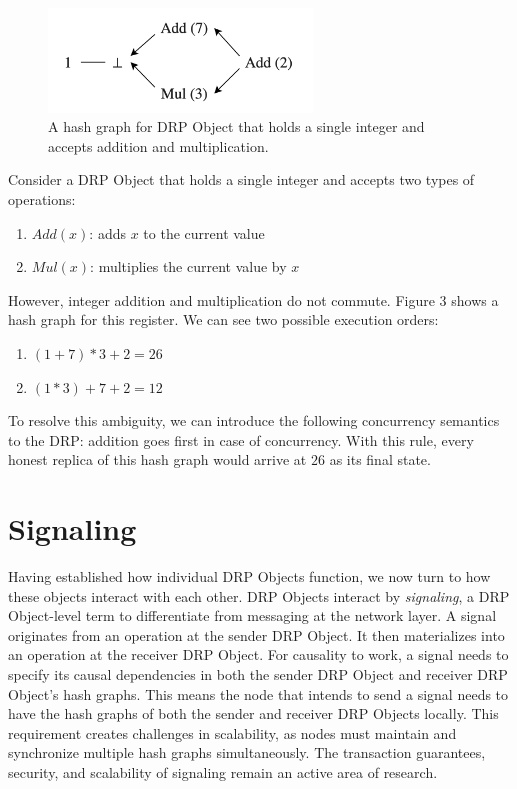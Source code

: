 \documentclass{article}
\begin{document}
\begin{figure}[htp]
    \centering
    \includegraphics[width=7cm]{fig3}
    \caption{A hash graph for DRP Object that holds a single integer and accepts addition and multiplication.}
    \label{fig:3}
\end{figure}

Consider a DRP Object that holds a single integer and accepts two types of operations:
\begin{enumerate}
    \item $Add(x)$: adds $x$ to the current value
    \item $Mul(x)$: multiplies the current value by $x$
\end{enumerate}

However, integer addition and multiplication do not commute. Figure 3 shows a hash graph for this register. We can see two possible execution orders:
\begin{enumerate}
    \item $(1+7)*3+2 = 26$
    \item $(1*3)+7+2 = 12$
\end{enumerate}

To resolve this ambiguity, we can introduce the following concurrency semantics to the DRP: addition goes first in case of concurrency. With this rule, every honest replica of this hash graph would arrive at $26$ as its final state.

\section{Signaling}
\label{sec:headings}

Having established how individual DRP Objects function, we now turn to how these objects interact with each other. DRP Objects interact by \textit{signaling}, a DRP Object-level term to differentiate from messaging at the network layer. A signal originates from an operation at the sender DRP Object. It then materializes into an operation at the receiver DRP Object. For causality to work, a signal needs to specify its causal dependencies in both the sender DRP Object and receiver DRP Object's hash graphs. This means the node that intends to send a signal needs to have the hash graphs of both the sender and receiver DRP Objects locally. This requirement creates challenges in scalability, as nodes must maintain and synchronize multiple hash graphs simultaneously. The transaction guarantees, security, and scalability of signaling remain an active area of research.
\end{document}
